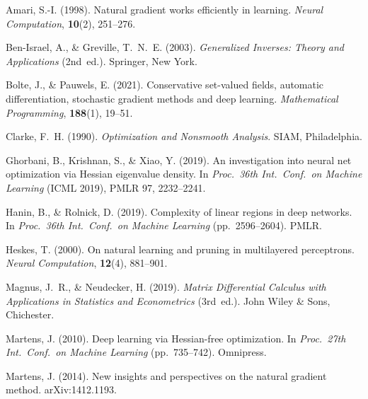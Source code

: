 \documentclass[11pt]{article}
\begin{document}

\begin{thebibliography}{99}

  Amari, S.-I. (1998).
  \newblock Natural gradient works efficiently in learning.
  \newblock \emph{Neural Computation}, \textbf{10}(2), 251--276.

  Ben-Israel, A., \& Greville, T.~N.~E. (2003).
  \newblock \emph{Generalized Inverses: Theory and Applications} (2nd~ed.).
  \newblock Springer, New York.

  Bolte, J., \& Pauwels, E. (2021).
  \newblock Conservative set-valued fields, automatic differentiation, stochastic
  gradient methods and deep learning.
  \newblock \emph{Mathematical Programming}, \textbf{188}(1), 19--51.

  Clarke, F.~H. (1990).
  \newblock \emph{Optimization and Nonsmooth Analysis}.
  \newblock SIAM, Philadelphia.

  Ghorbani, B., Krishnan, S., \& Xiao, Y. (2019).
  \newblock An investigation into neural net optimization via Hessian eigenvalue
  density.
  \newblock In \emph{Proc.\ 36th Int.\ Conf.\ on Machine Learning} (ICML 2019),
  PMLR 97, 2232--2241.

  Hanin, B., \& Rolnick, D. (2019).
  \newblock Complexity of linear regions in deep networks.
  \newblock In \emph{Proc.\ 36th Int.\ Conf.\ on Machine Learning}
  (pp.~2596--2604). PMLR.

  Heskes, T. (2000).
  \newblock On natural learning and pruning in multilayered perceptrons.
  \newblock \emph{Neural Computation}, \textbf{12}(4), 881--901.

  Magnus, J.~R., \& Neudecker, H. (2019).
  \newblock \emph{Matrix Differential Calculus with Applications in Statistics
  and Econometrics} (3rd~ed.).
  \newblock John Wiley \& Sons, Chichester.

  Martens, J. (2010).
  \newblock Deep learning via Hessian-free optimization.
  \newblock In \emph{Proc.\ 27th Int.\ Conf.\ on Machine Learning}
  (pp.~735--742). Omnipress.

  Martens, J. (2014).
  \newblock New insights and perspectives on the natural gradient method.
  \newblock arXiv:1412.1193.


\end{thebibliography}
\end{document}
